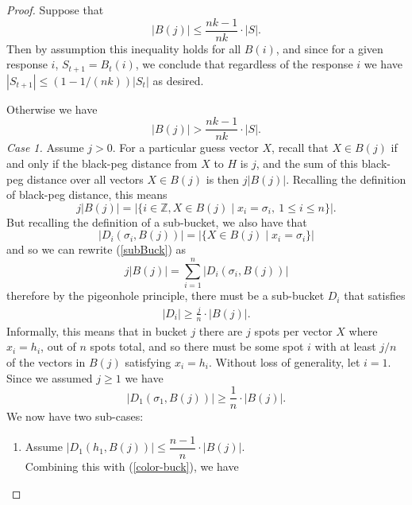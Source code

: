 \documentclass[12pt, a4paper]{article}
\newcommand{\Z}{\mathbb{Z}}           %
\begin{document}
\begin{proof}
	Suppose that
	\begin{equation*}
	|B(j)|\le\frac{nk - 1}{nk}\cdot|S|.
	\end{equation*}
	Then by assumption this inequality holds for all $B(i)$, and since for a given response $i$, $S_{t+1} = B_t(i)$, we conclude that regardless of the response $i$ we have $|S_{t+1}| \leq (1-1/(nk))|S_t|$ as desired.
	
	Otherwise we have
	\begin{equation*}
	|B(j)|>\frac{nk - 1}{nk}\cdot|S|.
	\end{equation*}
	\textit{Case 1.} Assume $j>0$. For a particular guess vector $X$, recall that $X \in B(j)$ if and only if the black-peg distance from $X$ to $H$ is $j$, and the sum of this black-peg distance over all vectors $X \in B(j)$ is then $j|B(j)|$. Recalling the definition of black-peg distance, this means 
	\begin{equation}\label{subBuck}
	j|B(j)| = \left|\{i\in\Z, X \in B(j) \mid x_i = \sigma_i,~ 1\le i\le n\}\right|.
	\end{equation}
	But recalling the definition of a sub-bucket, we also have that 
	\begin{equation*}
	|D_i(\sigma_i,B(j))| = \left|\{X \in B(j) \mid x_i = \sigma_i\}\right|
	\end{equation*}
	and so we can rewrite (\ref{subBuck}) as
	\begin{equation*}
	j|B(j)| = \sum_{i=1}^n |D_i(\sigma_i,B(j))|
	\end{equation*}
	therefore by the pigeonhole principle, there must be a sub-bucket $D_i$
	that satisfies
	\begin{align*}
	|D_i| \geq \frac{j}{n}\cdot|B(j)|.
	\end{align*}
	Informally, this means that in bucket $j$ there are $j$ spots per vector $X$ where $x_i = h_i$, out of $n$ spots total, and so there must be some spot $i$ with at least $j/n$ of the vectors in $B(j)$ satisfying $x_i = h_i$. Without loss of generality, let $i = 1$. Since we assumed $j \geq 1$ we have
	\begin{equation}\label{subBuckBound}
	|D_{1}(\sigma_1, B(j))|\ge \frac{1}{n}\cdot|B(j)|.
	\end{equation}
	We now have two sub-cases:
	\begin{enumerate}[label=\roman*.]
		\item Assume $|D_{1}(h_1, B(j))|\le \dfrac{n-1}{n}\cdot|B(j)|$.\\
		Combining this with (\ref{color-buck}), we have
		\begin{equation*}

\end{equation*}
\end{enumerate}
\end{proof}
\end{document}
